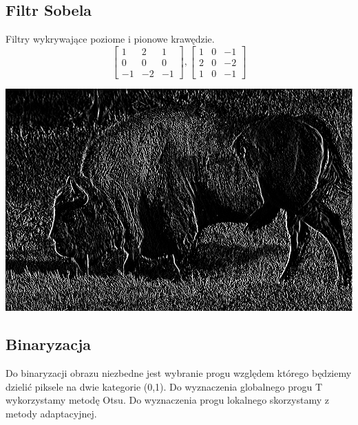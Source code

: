\documentclass{article}
\begin{document}
	\subsection{Filtr Sobela}
	Filtry wykrywające poziome i pionowe krawędzie.
	\begin{equation}
	\begin{bmatrix}
	1 & 2 & 1 \\
	0 & 0 & 0 \\
	-1 & -2 & -1 
	\end{bmatrix}
	,
	\begin{bmatrix}
	1 & 0 & -1 \\
	2 & 0 & -2 \\
	1 & 0 & -1 
	\end{bmatrix}
	\end{equation}
	
	\begin{center}
		\includegraphics[width=\linewidth]{../../lab03/bison_sobel.png}
		\label{fig:bison_sobel}
	\end{center}

	\subsection{Binaryzacja}
	Do binaryzacji obrazu niezbedne jest wybranie progu względem którego będziemy dzielić piksele na dwie kategorie (0,1).
	Do wyznaczenia globalnego progu T wykorzystamy metodę Otsu.
	Do wyznaczenia progu lokalnego skorzystamy z metody adaptacyjnej.
	
\end{document}
